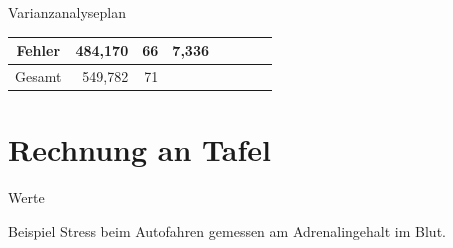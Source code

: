 \documentclass{beamer}
\begin{document}
\begin{frame}{Varianzanalyseplan}
\begin{table}[]
{\begin{tabular}{|c|r|r|r|r|r|r|r|}
				Fehler                  & 484,170                                   & 66                                       & 7,336                                    &                                              &                                    &                                                 &                                                \\ \hline
				Gesamt                  & 549,782                                   & 71                                       &                                          &                                              &                                    &                                                 &                                                \\ \hline
			\end{tabular}
		}
		\end{table}
	\end{frame}
	
	\section{Rechnung an Tafel} 
	
	\begin{frame}{Werte}
		\begin{block}{Beispiel}
			Stress beim Autofahren gemessen am Adrenalingehalt im Blut.
		\end{block}\vspace{2ex}
	\end{frame}
	
\end{document}
